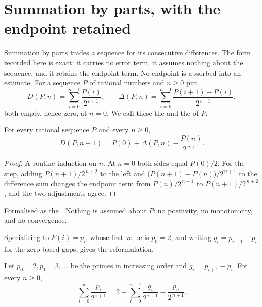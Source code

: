 \documentclass[11pt]{article}
\begin{document}
\section{Summation by parts, with the endpoint retained}\label{long251:sec:parts}

Summation by parts trades a sequence for its consecutive differences.  The form
recorded here is exact: it carries no error term, it assumes nothing about the
sequence, and it retains the endpoint term.  No endpoint is absorbed into an
estimate.  For a sequence $P$ of rational numbers and $n\ge0$ put
\[
 D(P,n)=\sum_{i=0}^{n-1}\frac{P(i)}{2^{\,i+1}},
 \qquad
 \Delta(P,n)=\sum_{i=0}^{n-1}\frac{P(i+1)-P(i)}{2^{\,i+1}} ,
\]
both empty, hence zero, at $n=0$.  We call these the
 and the
 of $P$.

\begin{proposition}\label{long251:res:abel}
For every rational sequence $P$ and every $n\ge0$,
\[
 D(P,n+1)=P(0)+\Delta(P,n)-\frac{P(n)}{2^{\,n+1}} .
\]
\end{proposition}

\begin{proof}
A routine induction on $n$.  At $n=0$ both sides equal $P(0)/2$.  For the step,
adding $P(n+1)/2^{\,n+2}$ to the left and $\bigl(P(n+1)-P(n)\bigr)/2^{\,n+1}$
to the difference sum changes the endpoint term from $P(n)/2^{\,n+1}$ to
$P(n+1)/2^{\,n+2}$, and the two adjustments agree.
\end{proof}

\noindent Formalised as the
.  Nothing is assumed about $P$: no positivity, no monotonicity, and
no convergence.

Specialising to $P(i)=p_i$, whose first value is $p_0=2$, and writing
$g_i=p_{i+1}-p_i$ for the zero-based gaps, gives the reformulation.

\begin{theorem}\label{long251:res:parts}
Let $p_0=2,p_1=3,\ldots$ be the primes in increasing order and
$g_i=p_{i+1}-p_i$.  For every $n\ge0$,
\[
 \sum_{i=0}^{n}\frac{p_i}{2^{\,i+1}}
 =2+\sum_{i=0}^{n-1}\frac{g_i}{2^{\,i+1}}-\frac{p_n}{2^{\,n+1}} .
\]
\end{theorem}
\end{document}
